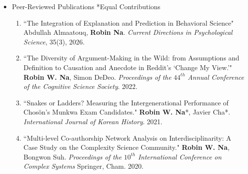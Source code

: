 \documentclass[11pt,a4paper,roman]{moderncv}        %
\begin{document}
\begin{itemize}
    \item Peer-Reviewed Publications \hfill \footnotesize{*Equal Contributions}
    \vspace{0.3em} %
    \small{
	\begin{enumerate}
        \item ``The Integration of Explanation and Prediction in Behavioral Science" Abdullah Almaatouq, \textbf{Robin Na}. \textit{Current Directions in Psychological Science}, 35(3), 2026.
        \item ``The Diversity of Argument-Making in the Wild: from Assumptions and Definition to Causation and Anecdote in Reddit's `Change My View.'" \textbf{Robin W. Na}, Simon DeDeo. \textit{Proceedings of the $44^{th}$ Annual Conference of the Cognitive Science Society}. 2022. %
      \item ``Snakes or Ladders? Measuring the Intergenerational Performance of Chosŏn’s Munkwa Exam Candidates." \textbf{Robin W. Na}*, Javier Cha*. \textit{International Journal of Korean History}. 2021.
	  \item ``Multi-level Co-authorship Network Analysis on Interdisciplinarity: A Case Study on the Complexity Science Community." \textbf{Robin W. Na}, Bongwon Suh. \textit{Proceedings of the $10^{th}$ International Conference on Complex Systems} Springer, Cham. 2020.
	\end{enumerate}}%
\end{itemize}

\vspace{0.7em} %
\end{document}
